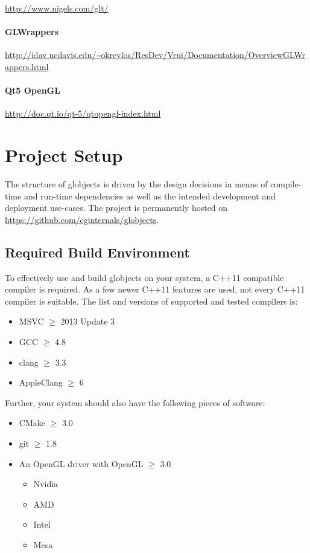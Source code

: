 \documentclass{article}
\begin{document}
\url{http://www.nigels.com/glt/}

\paragraph{GLWrappers}

\url{http://idav.ucdavis.edu/~okreylos/ResDev/Vrui/Documentation/OverviewGLWrappers.html}

\paragraph{Qt5 OpenGL}

\url{http://doc.qt.io/qt-5/qtopengl-index.html}

\section{Project Setup}

The structure of globjects is driven by the design decisions in means of compile-time and run-time dependencies as well as the intended development and deployment use-cases. The project is permanently hosted on \url{https://github.com/cginternals/globjects}.

\subsection{Required Build Environment}

To effectively use and build globjects on your system, a C++11 compatible compiler is required. As a few newer C++11 features are used, not every C++11 compiler is suitable. The list and versions of supported and tested compilers is:
\begin{itemize}
	\item MSVC $\geq$ 2013 Update 3
	\item GCC  $\geq$ 4.8
	\item clang $\geq$ 3.3
	\item AppleClang $\geq$ 6
\end{itemize}
Further, your system should also have the following pieces of software:
\begin{itemize}
	\item CMake $\geq$ 3.0
	\item git $\geq$ 1.8
	\item An OpenGL driver with OpenGL $\geq$ 3.0
	\begin{itemize}
		\item Nvidia
		\item AMD
		\item Intel
		\item Mesa
	\end{itemize}
\end{itemize}
\end{document}

